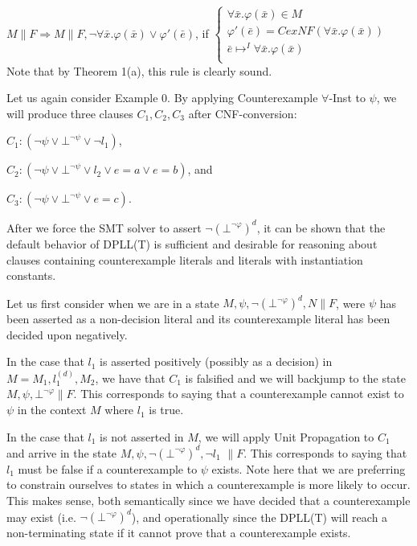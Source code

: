 \documentclass{llncs}
\begin{document}
$M \parallel F \Longrightarrow M \parallel F, \neg \forall \bar{x}. \varphi( \bar{ x } ) \vee \varphi'( \bar{ e } )$, if   
$\begin{cases}
  \forall \bar{x}. \varphi( \bar{ x } ) \in M \\
  \varphi'( \bar{ e } ) = CexNF( \forall \bar{x}. \varphi( \bar{ x } ) ) \\
  \bar{ e } \mapsto^I \forall \bar{x}. \varphi( \bar{ x } ) \\
\end{cases}$ \\

Note that by Theorem 1(a), this rule is clearly sound.

Let us again consider Example 0.
By applying Counterexample $\forall$-Inst to $\psi$, we will produce three clauses $C_1, C_2, C_3$ after CNF-conversion:

$C_1 : ( \neg \psi \vee \bot^{\neg \psi} \vee \neg l_1)$,

$C_2 : ( \neg \psi \vee \bot^{\neg \psi} \vee l_2 \vee e = a \vee e = b )$, and

$C_3 : ( \neg \psi \vee \bot^{\neg \psi} \vee e = c )$.

After we force the SMT solver to assert $\neg( \bot^{\neg \varphi} )^d$, it can be shown that the default behavior of DPLL(T) is sufficient and desirable for reasoning about clauses containing counterexample literals and literals with instantiation constants.

Let us first consider when we are in a state $M, \psi, \neg( \bot^{\neg \varphi} )^d, N \parallel F$, were $\psi$ has been asserted as a non-decision literal and its counterexample literal has been decided upon negatively.

In the case that $l_1$ is asserted positively (possibly as a decision) in $M = M_1, l^{(d)}_1, M_2$, we have that $C_1$ is falsified and we will backjump to the state $M, \psi, \bot^{\neg \varphi} \parallel F$.
This corresponds to saying that a counterexample cannot exist to $\psi$ in the context $M$ where $l_1$ is true.

In the case that $l_1$ is not asserted in $M$, we will apply Unit Propagation to $C_1$ and arrive in the state $M, \psi, \neg( \bot^{\neg \varphi} )^d, \neg l_1$ $\parallel F$.
This corresponds to saying that $l_1$ must be false if a counterexample to $\psi$ exists.
Note here that we are preferring to constrain ourselves to states in which a counterexample is more likely to occur.
This makes sense, both semantically since we have decided that a counterexample may exist (i.e. $\neg( \bot^{\neg \varphi} )^d$), and operationally since the DPLL(T) will reach a non-terminating state if it cannot prove that a counterexample exists.
\end{document}
